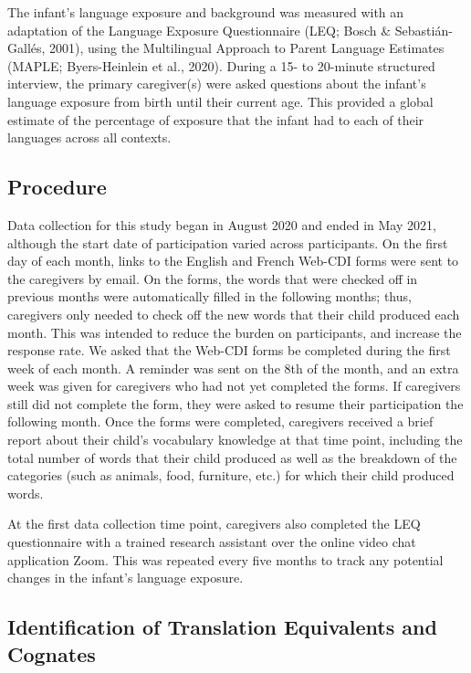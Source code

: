\documentclass[
  english,
  ,man,floatsintext]{apa6}
\begin{document}
The infant's language exposure and background was measured with an adaptation of the Language Exposure Questionnaire (LEQ; Bosch \& Sebastián-Gallés, 2001), using the Multilingual Approach to Parent Language Estimates (MAPLE; Byers-Heinlein et al., 2020). During a 15- to 20-minute structured interview, the primary caregiver(s) were asked questions about the infant's language exposure from birth until their current age. This provided a global estimate of the percentage of exposure that the infant had to each of their languages across all contexts.

\hypertarget{procedure}{%
\subsection{Procedure}\label{procedure}}

Data collection for this study began in August 2020 and ended in May 2021, although the start date of participation varied across participants. On the first day of each month, links to the English and French Web-CDI forms were sent to the caregivers by email. On the forms, the words that were checked off in previous months were automatically filled in the following months; thus, caregivers only needed to check off the new words that their child produced each month. This was intended to reduce the burden on participants, and increase the response rate. We asked that the Web-CDI forms be completed during the first week of each month. A reminder was sent on the 8th of the month, and an extra week was given for caregivers who had not yet completed the forms. If caregivers still did not complete the form, they were asked to resume their participation the following month. Once the forms were completed, caregivers received a brief report about their child's vocabulary knowledge at that time point, including the total number of words that their child produced as well as the breakdown of the categories (such as animals, food, furniture, etc.) for which their child produced words.

At the first data collection time point, caregivers also completed the LEQ questionnaire with a trained research assistant over the online video chat application Zoom. This was repeated every five months to track any potential changes in the infant's language exposure.

\hypertarget{identification-of-translation-equivalents-and-cognates}{%
\subsection{Identification of Translation Equivalents and Cognates}\label{identification-of-translation-equivalents-and-cognates}}
\end{document}
